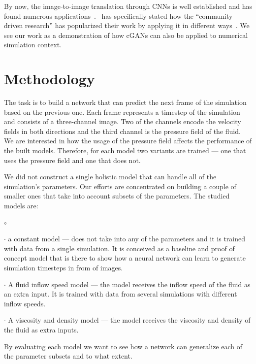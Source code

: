 \documentclass{llncs}
\begin{document}
By now, the image-to-image translation through CNNs is well established and has found numerous applications~\cite{zhao2020,liu2017,ZhangXLZHWM16,park2019}.~\cite{pix2pix} has specifically stated how the ``community-driven research'' has popularized their work by applying it in different ways~\cite{Moschoglou2019,Kim2020,Chen2019}. We see our work as a demonstration of how cGANs can also be applied to numerical simulation context.

\section{Methodology}\label{methodology}
The task is to build a network that can predict the next frame of the simulation based on the previous one. Each frame represents a timestep of the simulation and consists of a three-channel image. Two of the channels encode the velocity fields in both directions and the third channel is the pressure field of the fluid. We are interested in how the usage of the pressure field affects the performance of the built models. Therefore, for each model two variants are trained --- one that uses the pressure field and one that does not.

We did not construct a single holistic model that can handle all of the simulation's parameters. Our efforts are concentrated on building a couple of smaller ones that take into account subsets of the parameters. The studied models are:
\begin{list}{$\circ$}{}
\item[$\cdot$] a constant model --- does not take into any of the parameters and it is trained with data from a single simulation. It is conceived as a baseline and proof of concept model that is there to show how a neural network can learn to generate simulation timesteps in from of images.
\item[$\cdot$] A fluid inflow speed model --- the model receives the inflow speed of the fluid as an extra input. It is trained with data from several simulations with different inflow speeds.
\item[$\cdot$] A viscosity and density model --- the model receives the viscosity and density of the fluid as extra inputs.
\end{list}
By evaluating each model we want to see how a network can generalize each of the parameter subsets and to what extent.
\end{document}
